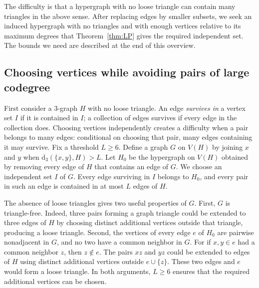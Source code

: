 \documentclass[11pt]{article}
\numberwithin{equation}{section}
\theoremstyle{remark}
\newcommand{\dd}{\mathrm d}
\begin{document}
The difficulty is that a hypergraph with no loose triangle can contain many triangles in the above sense. After replacing edges by smaller subsets, we seek an induced hypergraph with no triangles and with enough vertices relative to its maximum degrees that Theorem~\ref{thm:LP} gives the required independent set. The bounds we need are described at the end of this overview.

\subsection{Choosing vertices while avoiding pairs of large codegree}
First consider a $3$-graph $H$ with no loose triangle. An edge \emph{survives in} a vertex set $I$ if it is contained in $I$; a collection of edges survives if every edge in the collection does. Choosing vertices independently creates a difficulty when a pair belongs to many edges: conditional on choosing that pair, many edges containing it may survive. Fix a threshold $L\ge6$. Define a graph $G$ on $V(H)$ by joining $x$ and $y$ when $\dd_3(\{x,y\},H)>L$. Let $H_0$ be the hypergraph on $V(H)$ obtained by removing every edge of $H$ that contains an edge of $G$. We choose an independent set $I$ of $G$. Every edge surviving in $I$ belongs to $H_0$, and every pair in such an edge is contained in at most $L$ edges of $H$.

The absence of loose triangles gives two useful properties of $G$. First, $G$ is triangle-free. Indeed, three pairs forming a graph triangle could be extended to three edges of $H$ by choosing distinct additional vertices outside that triangle, producing a loose triangle. Second, the vertices of every edge $e$ of $H_0$ are pairwise nonadjacent in $G$, and no two have a common neighbor in $G$. For if $x,y\in e$ had a common neighbor $z$, then $z\notin e$. The pairs $xz$ and $yz$ could be extended to edges of $H$ using distinct additional vertices outside $e\cup\{z\}$. These two edges and $e$ would form a loose triangle. In both arguments, $L\ge6$ ensures that the required additional vertices can be chosen.
\end{document}
